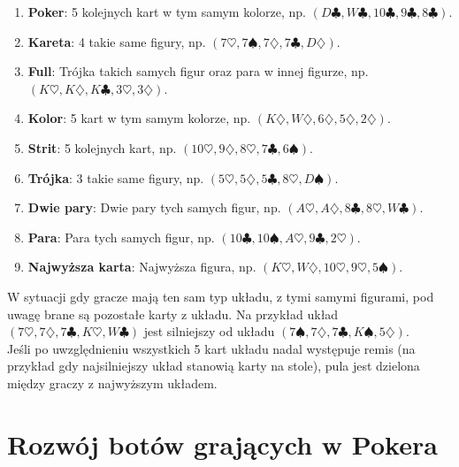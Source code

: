 \documentclass[magisterska]{pracamgr}
\begin{document}
\begin{enumerate}
\item \textbf{Poker}: 5 kolejnych kart w tym samym kolorze, np. $(D\clubsuit, W\clubsuit, 10\clubsuit, 9\clubsuit, 8\clubsuit)$. 
\item \textbf{Kareta}: 4 takie same figury, np. $(7\heartsuit, 7\spadesuit, 7\diamondsuit, 7\clubsuit, D\diamondsuit)$.
\item \textbf{Full}: Trójka takich samych figur oraz para w innej figurze, np. $(K\heartsuit, K\diamondsuit, K\clubsuit, 3\heartsuit, 3\diamondsuit)$. 
\item \textbf{Kolor}: 5 kart w tym samym kolorze, np. $(K\diamondsuit, W\diamondsuit, 6\diamondsuit, 5\diamondsuit, 2\diamondsuit)$.
\item \textbf{Strit}: 5 kolejnych kart, np. $(10\heartsuit, 9\diamondsuit, 8\heartsuit, 7\clubsuit, 6\spadesuit)$.
\item \textbf{Trójka}: 3 takie same figury, np. $(5\heartsuit, 5\diamondsuit, 5\clubsuit, 8\heartsuit, D\spadesuit)$.
\item \textbf{Dwie pary}: Dwie pary tych samych figur, np. $(A\heartsuit, A\diamondsuit, 8\clubsuit, 8\heartsuit, W\clubsuit)$.
\item \textbf{Para}: Para tych samych figur, np. $(10\clubsuit, 10\spadesuit, A\heartsuit, 9\clubsuit, 2\heartsuit)$.
\item \textbf{Najwyższa karta}: Najwyższa figura, np. $(K\heartsuit, W\diamondsuit, 10\heartsuit, 9\heartsuit, 5\spadesuit)$.
\end{enumerate}

\noindent
W sytuacji gdy gracze mają ten sam typ układu, z tymi samymi figurami, pod uwagę brane są pozostałe karty z układu. Na przykład
układ $(7\heartsuit, 7\diamondsuit, 7\clubsuit, K\heartsuit, W\clubsuit)$ jest silniejszy od układu
$(7\spadesuit, 7\diamondsuit, 7\clubsuit, K\spadesuit, 5\diamondsuit)$. \\

\noindent
Jeśli po uwzględnieniu wszystkich 5 kart układu nadal występuje remis (na przykład gdy najsilniejszy układ stanowią karty na stole),
pula jest dzielona między graczy z najwyższym układem.

\section{Rozwój botów grających w Pokera}
\end{document}
